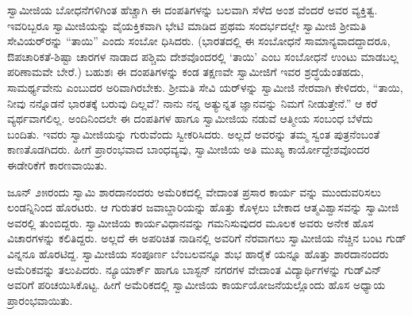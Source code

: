 ಸ್ವಾಮೀಜಿಯ ಬೋಧನೆಗಳಿಗಿಂತ ಹೆಚ್ಚಾಗಿ ಈ ದಂಪತಿಗಳನ್ನು ಬಲವಾಗಿ ಸೆಳೆದ ಅಂಶ ವೆಂದರೆ ಅವರ ವ್ಯಕ್ತಿತ್ವ. ಇವರಿಬ್ಬರೂ ಸ್ವಾಮೀಜಿಯನ್ನು ವೈಯಕ್ತಿಕವಾಗಿ ಭೇಟಿ ಮಾಡಿದ ಪ್ರಥಮ ಸಂದರ್ಭದಲ್ಲೇ ಸ್ವಾಮೀಜಿ ಶ್ರೀಮತಿ ಸೇವಿಯರ್​ರನ್ನು “ತಾಯಿ” ಎಂದು ಸಂಬೋ ಧಿಸಿದರು. (ಭಾರತದಲ್ಲಿ ಈ ಸಂಬೋಧನೆ ಸಾಮಾನ್ಯವಾದದ್ದಾದರೂ, ಔಪಚಾರಿಕತೆ-ಶಿಷ್ಟಾ ಚಾರಗಳ ನಾಡಾದ ಪಶ್ಚಿಮ ದೇಶವೊಂದರಲ್ಲಿ ‘ತಾಯಿ’ ಎಂಬ ಸಂಬೋಧನೆ ಉಂಟು ಮಾಡಬಲ್ಲ ಪರಿಣಾಮವೇ ಬೇರೆ.) ಬಹುಶಃ ಈ ದಂಪತಿಗಳನ್ನು ಕಂಡ ತಕ್ಷಣವೇ ಸ್ವಾಮೀಜಿಗೆ ಇವರ ಶ್ರದ್ಧೆಯೆಂತಹದು, ಸಾಮರ್ಥ್ಯವೇನು ಎಂಬುದರ ಅರಿವಾಗಿರಬೇಕು. ಶ್ರೀಮತಿ ಸೇವಿ ಯರ್​ಳನ್ನು ಸ್ವಾಮೀಜಿ ನೇರವಾಗಿ ಕೇಳಿದರು, “ತಾಯಿ, ನೀವು ನನ್ನೊಡನೆ ಭಾರತಕ್ಕೆ ಬರುವು ದಿಲ್ಲವೆ? ನಾನು ನನ್ನ ಅತ್ಯುನ್ನತ ಜ್ಞಾನವನ್ನು ನಿಮಗೆ ನೀಡುತ್ತೇನೆ.” ಆ ಕರೆ ವ್ಯರ್ಥವಾಗಲಿಲ್ಲ. ಅಂದಿನಿಂದಲೇ ಈ ದಂಪತಿಗಳ ಹಾಗೂ ಸ್ವಾಮೀಜಿಯ ನಡುವೆ ಆತ್ಮೀಯ ಸಂಬಂಧ ಬೆಳೆದು ಬಂದಿತು. ಇವರು ಸ್ವಾಮೀಜಿಯನ್ನು ಗುರುವೆಂದು ಸ್ವೀಕರಿಸಿದರು. ಅಲ್ಲದೆ ಅವರನ್ನು ತಮ್ಮ ಸ್ವಂತ ಪುತ್ರನೆಂಬಂತೆ ಕಾಣತೊಡಗಿದರು. ಹೀಗೆ ಪ್ರಾರಂಭವಾದ ಬಾಂಧವ್ಯವು, ಸ್ವಾಮೀಜಿಯ ಅತಿ ಮುಖ್ಯ ಕಾರ್ಯೋದ್ದೇಶವೊಂದರ ಈಡೇರಿಕೆಗೆ ಕಾರಣವಾಯಿತು.

ಜೂನ್ ೨೫ರಂದು ಸ್ವಾಮಿ ಶಾರದಾನಂದರು ಅಮೆರಿಕದಲ್ಲಿ ವೇದಾಂತ ಪ್ರಸಾರ ಕಾರ್ಯ ವನ್ನು ಮುಂದುವರಿಸಲು ಲಂಡನ್ನಿನಿಂದ ಹೊರಟರು. ಆ ಗುರುತರ ಜವಾಬ್ದಾರಿಯನ್ನು ಹೊತ್ತು ಕೊಳ್ಳಲು ಬೇಕಾದ ಆತ್ಮವಿಶ್ವಾಸವನ್ನು ಸ್ವಾಮೀಜಿ ಅವರಲ್ಲಿ ತುಂಬಿದ್ದರು. ಸ್ವಾಮೀಜಿಯ ಕಾರ್ಯವಿಧಾನವನ್ನು ಗಮನಿಸುವುದರ ಮೂಲಕ ಅವರು ಅನೇಕ ಹೊಸ ವಿಚಾರಗಳನ್ನು ಕಲಿತಿದ್ದರು. ಅಲ್ಲದೆ ಈ ಅಪರಿಚಿತ ನಾಡಿನಲ್ಲಿ ಅವರಿಗೆ ನೆರವಾಗಲು ಸ್ವಾಮೀಜಿಯ ನೆಚ್ಚಿನ ಬಂಟ ಗುಡ್​ವಿನ್ನನೂ ಹೊರಟಿದ್ದ. ಸ್ವಾಮೀಜಿಯ ಸಂಪೂರ್ಣ ಬೆಂಬಲವನ್ನೂ ಶುಭ ಹಾರೈಕೆ ಯನ್ನೂ ಹೊತ್ತು ಶಾರದಾನಂದರು ಅಮೆರಿಕವನ್ನು ತಲುಪಿದರು. ನ್ಯೂಯಾರ್ಕ್ ಹಾಗೂ ಬಾಸ್ಟನ್ ನಗರಗಳ ವೇದಾಂತ ವಿದ್ಯಾರ್ಥಿಗಳನ್ನು ಗುಡ್​ವಿನ್ ಅವರಿಗೆ ಪರಿಚಯಿಸಿಕೊಟ್ಟ. ಹೀಗೆ ಅಮೆರಿಕದಲ್ಲಿ ಸ್ವಾಮೀಜಿಯ ಕಾರ್ಯಯೋಜನೆಯಲ್ಲೊಂದು ಹೊಸ ಅಧ್ಯಾಯ ಪ್ರಾರಂಭವಾಯಿತು.

